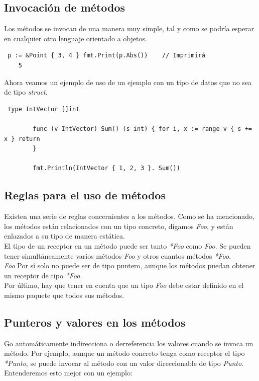 	\subsection{Invocación de métodos}

	Los métodos se invocan de una manera muy simple, tal y como se podría
	esperar en cualquier otro lenguaje orientado a objetos.

	\begin{verbatim} p := &Point { 3, 4 } fmt.Print(p.Abs())    // Imprimirá
	5 \end{verbatim}

	Ahora veamos un ejemplo de uso de un ejemplo con un tipo de datos que no sea
	de tipo \textit{struct}.

	\begin{verbatim} type IntVector []int
    
		func (v IntVector) Sum() (s int) { for i, x := range v { s += x } return
		}
    
		fmt.Println(IntVector { 1, 2, 3 }. Sum()) \end{verbatim}

	\subsection{Reglas para el uso de métodos}

	Existen una serie de reglas concernientes a los métodos. Como se ha
	mencionado, los métodos están relacionados con un tipo concreto, digamos
	\textit{Foo}, y están enlazados a su tipo de manera estática.\\

	El tipo de un receptor en un método puede ser tanto \textit{*Foo} como
	\textit{Foo}. Se pueden tener simultáneamente varios métodos \textit{Foo}
	y otros cuantos métodos \textit{*Foo}.\\

	\textit{Foo} Por sí solo no puede ser de tipo puntero, aunque los métodos
	puedan obtener un receptor de tipo \textit{*Foo}.\\

	Por último, hay que tener en cuenta que un tipo \textit{Foo} debe estar
	definido en el mismo paquete que todos sus métodos.

	\subsection{Punteros y valores en los métodos}

	Go automáticamente indirecciona o derreferencia los valores cuando se invoca
	un método. Por ejemplo, aunque un método concreto tenga como receptor el
	tipo \textit{*Punto}, se puede invocar al método con un valor direccionable
	de tipo \textit{Punto}. Entenderemos esto mejor con un ejemplo:

